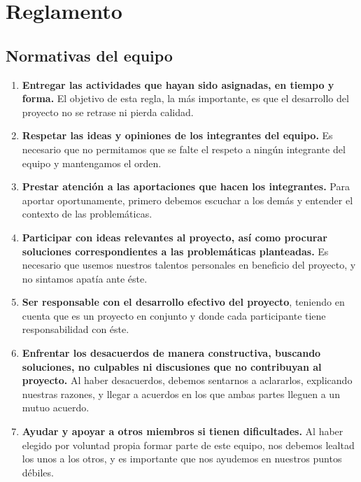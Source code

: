 \section{Reglamento}
\label{reglamento}

\subsection{Normativas del equipo}
\label{normativas-del-equipo}

\begin{enumerate}
	\def\labelenumi{\arabic{enumi}.} \tightlist

	\item \textbf{Entregar las actividades que hayan sido asignadas, en tiempo y forma.} El objetivo de esta regla, la más importante, es que el desarrollo del proyecto no se retrase ni pierda calidad.

	\item \textbf{Respetar las ideas y opiniones de los integrantes del equipo.} Es necesario que no permitamos que se falte el respeto a ningún integrante del equipo y mantengamos el orden.

	\item \textbf{Prestar atención a las aportaciones que hacen los integrantes.} Para aportar oportunamente, primero debemos escuchar a los demás y entender el contexto de las problemáticas.

	\item \textbf{Participar con ideas relevantes al proyecto, así como procurar soluciones correspondientes a las problemáticas planteadas.} Es necesario que usemos nuestros talentos personales en beneficio del proyecto, y no sintamos apatía ante éste.

	\item \textbf{Ser responsable con el desarrollo efectivo del proyecto}, teniendo en cuenta que es un proyecto en conjunto y donde cada participante tiene responsabilidad con éste.

	\item \textbf{Enfrentar los desacuerdos de manera constructiva, buscando soluciones, no culpables ni discusiones que no contribuyan al proyecto.} Al haber desacuerdos, debemos sentarnos a aclararlos, explicando nuestras razones, y llegar a acuerdos en los que ambas partes lleguen a un mutuo acuerdo.

	\item \textbf{Ayudar y apoyar a otros miembros si tienen dificultades.} Al haber elegido por voluntad propia formar parte de este equipo, nos debemos lealtad los unos a los otros, y es importante que nos ayudemos en nuestros puntos débiles.
\end{enumerate}


